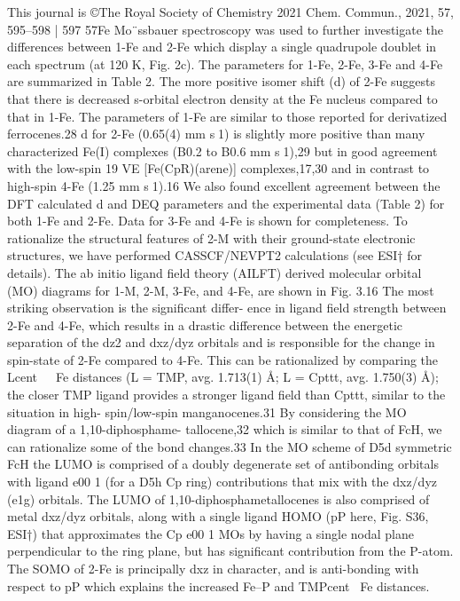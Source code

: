 \documentclass{article}
\begin{document}
This journal is ©The Royal Society of Chemistry 2021
Chem. Commun., 2021, 57, 595--598 | 597
57Fe Mo¨ssbauer spectroscopy was used to further investigate
the diﬀerences between 1-Fe and 2-Fe which display a single
quadrupole doublet in each spectrum (at 120 K, Fig. 2c). The
parameters for 1-Fe, 2-Fe, 3-Fe and 4-Fe are summarized in
Table 2. The more positive isomer shift (d) of 2-Fe suggests
that there is decreased s-orbital electron density at the Fe
nucleus compared to that in 1-Fe. The parameters of 1-Fe are
similar to those reported for derivatized ferrocenes.28 d for 2-Fe
(0.65(4) mm s1) is slightly more positive than many characterized
Fe(I) complexes (B0.2 to B0.6 mm s1),29 but in good agreement
with the low-spin 19 VE [Fe(CpR)(arene)] complexes,17,30 and in
contrast to high-spin 4-Fe (1.25 mm s1).16 We also found excellent
agreement between the DFT calculated d and DEQ parameters and
the experimental data (Table 2) for both 1-Fe and 2-Fe. Data for
3-Fe and 4-Fe is shown for completeness.
To rationalize the structural features of 2-M with their
ground-state
electronic
structures,
we
have
performed
CASSCF/NEVPT2 calculations (see ESI† for details). The ab
initio ligand field theory (AILFT) derived molecular orbital
(MO) diagrams for 1-M, 2-M, 3-Fe, and 4-Fe, are shown in
Fig. 3.16 The most striking observation is the significant diﬀer-
ence in ligand field strength between 2-Fe and 4-Fe, which
results in a drastic diﬀerence between the energetic separation
of the dz2 and dxz/dyz orbitals and is responsible for the change
in spin-state of 2-Fe compared to 4-Fe. This can be rationalized
by comparing the Lcent  Fe distances (L = TMP, avg. 1.713(1) Å;
L = Cpttt, avg. 1.750(3) Å); the closer TMP ligand provides a
stronger ligand field than Cpttt, similar to the situation in high-
spin/low-spin manganocenes.31
By considering the MO diagram of a 1,10-diphosphame-
tallocene,32 which is similar to that of FcH, we can rationalize some
of the bond changes.33 In the MO scheme of D5d symmetric FcH the
LUMO is comprised of a doubly degenerate set of antibonding
orbitals with ligand e00
1 (for a D5h Cp ring) contributions that mix with
the dxz/dyz (e1g) orbitals. The LUMO of 1,10-diphosphametallocenes
is also comprised of metal dxz/dyz orbitals, along with a single ligand
HOMO (pP here, Fig. S36, ESI†) that approximates the Cp e00
1 MOs by
having a single nodal plane perpendicular to the ring plane, but has
significant contribution from the P-atom. The SOMO of 2-Fe is
principally dxz in character, and is anti-bonding with respect to pP
which explains the increased Fe–P and TMPcentFe distances.
\end{document}
